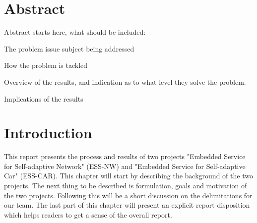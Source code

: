 \documentclass[11pt, titlepage]{article} %
\begin{document}
\begin{titlepage}
	
	 
	
	\vfill %
	
\end{titlepage}


\clearpage
\section*{Abstract}
Abstract starts here,
what should be included:

The problem issue subject being addressed

How the problem is tackled

Overview of the results, and indication as to what level they solve the problem.

Implications of the results

\clearpage
\tableofcontents

\clearpage
\listoffigures

\clearpage
\listoftables

\clearpage
\section{Introduction}
This report presents the process and results of two projects "Embedded Service for Self-adaptive Network" (ESS-NW) and "Embedded Service for Self-adaptive Car" (ESS-CAR). This chapter will start by describing the background of the two projects. The next thing to be described is formulation, goals and motivation of the two projects. Following this will be a short discussion on the delimitations for our team. The last part of this chapter will present an explicit report disposition which helps readers to get a sense of the overall report.
\end{document}
